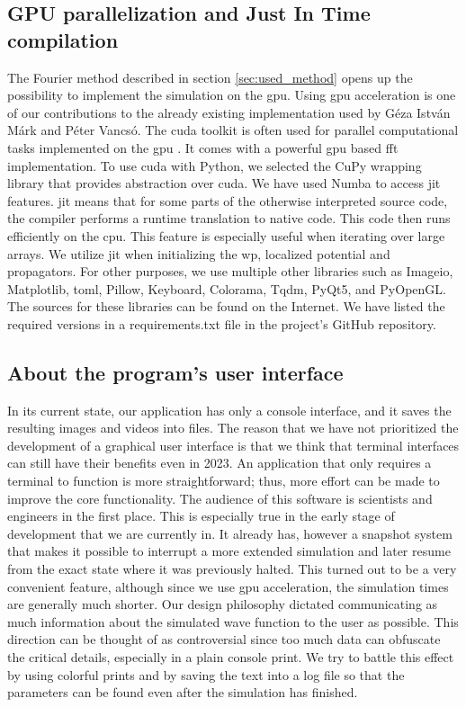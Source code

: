\subsection{GPU parallelization and Just In Time compilation}

The Fourier method described in section \ref{sec:used_method} opens up the possibility to implement the simulation on the \acrshort{gpu}.
Using \acrshort{gpu} acceleration is one of our contributions to the already existing implementation used by Géza István Márk and Péter Vancsó.
The \acrfull{cuda} toolkit is often used for parallel computational tasks implemented on the \acrshort{gpu} \cite{cuda2008}.
It comes with a powerful \acrshort{gpu} based \acrshort{fft} implementation.
To use \acrshort{cuda} with Python, we selected the CuPy wrapping library \cite{cupy_learningsys2017} that provides abstraction over \acrshort{cuda}.
We have used Numba to access \acrfull{jit} features.
\acrshort{jit} means that for some parts of the otherwise interpreted source code, the compiler performs a runtime translation to native code.
This code then runs efficiently on the \acrshort{cpu}.
This feature is especially useful when iterating over large arrays.
We utilize \acrshort{jit} when initializing the \acrshort{wp}, localized potential and propagators.
For other purposes, we use multiple other libraries such as Imageio, Matplotlib, toml, Pillow, Keyboard, Colorama, Tqdm, PyQt5, and PyOpenGL.
The sources for these libraries can be found on the Internet.
We have listed the required versions in a requirements.txt file in the project's GitHub repository.

\subsection{About the program's user interface}

In its current state, our application has only a console interface, and it saves the resulting images and videos into files.
The reason that we have not prioritized the development of a graphical user interface is that we think that terminal interfaces can still have their benefits even in 2023.
An application that only requires a terminal to function is more straightforward; thus, more effort can be made to improve the core functionality.
The audience of this software is scientists and engineers in the first place.
This is especially true in the early stage of development that we are currently in.
It already has, however a snapshot system that makes it possible to interrupt a more extended simulation and later resume from the exact state where it was previously halted.
This turned out to be a very convenient feature, although since we use \acrshort{gpu} acceleration, the simulation times are generally much shorter.
Our design philosophy dictated communicating as much information about the simulated wave function to the user as possible.
This direction can be thought of as controversial since too much data can obfuscate the critical details, especially in a plain console print.
We try to battle this effect by using colorful prints and by saving the text into a log file so that the parameters can be found even after the simulation has finished.


